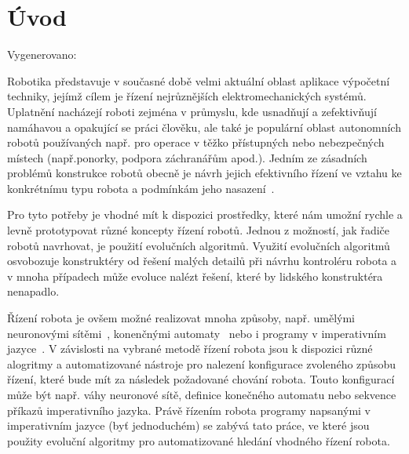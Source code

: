 
\chapter{Úvod}
Vygenerovano: \DTMnow








Robotika představuje v současné době velmi aktuální oblast aplikace výpočetní techniky, jejímž cílem je řízení nejrůznějších
elektromechanických systémů.
Uplatnění nacházejí roboti zejména v průmyslu, kde usnadňují a zefektivňují namáhavou a
opakující se práci člověku, ale také je populární oblast autonomních robotů používaných např. pro operace v těžko přístupných
nebo nebezpečných místech (např.ponorky, podpora záchranářům apod.).
Jedním ze zásadních problémů konstrukce robotů obecně je návrh jejich efektivního řízení ve vztahu ke konkrétnímu typu robota a podmínkám jeho nasazení~\cite{Bongard2013}.

Pro tyto potřeby je vhodné mít k dispozici prostředky, které nám umožní rychle a levně prototypovat různé koncepty řízení
robotů.
Jednou z možností, jak řadiče robotů navrhovat, je použití evolučních algoritmů.
Využití evolučních algoritmů osvobozuje konstruktéry od řešení malých detailů při návrhu kontroléru robota a v mnoha případech může evoluce nalézt řešení, které by lidského konstruktéra nenapadlo.

Řízení robota je ovšem možné realizovat mnoha způsoby, např. umělými neuronovými sítěmi~\cite{Reil2002}, konenčnými automaty~\cite{Hodgins1996} nebo i programy v imperativním jazyce~\cite{Wolff2007}.
V závislosti na vybrané metodě řízení robota jsou k dispozici různé alogritmy a automatizované nástroje pro nalezení konfigurace zvoleného způsobu řízení, které bude mít za následek požadované chování robota.
Touto konfigurací může být např. váhy neuronové sítě, definice konečného automatu nebo sekvence příkazů imperativního jazyka.
Právě řízením robota programy napsanými v imperativním jazyce (byť jednoduchém) se zabývá tato práce, ve které jsou použity evoluční algoritmy pro automatizované hledání vhodného řízení robota.

